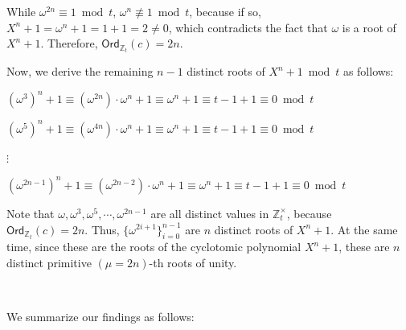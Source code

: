 While $\omega^{2n} \equiv 1 \bmod t$, $\omega^{n} \not\equiv 1 \bmod t$, because if so, $X^n + 1 = \omega^n + 1 = 1 + 1 = 2 \neq 0$, which contradicts the fact that $\omega$ is a root of $X^n + 1$. Therefore, $\textsf{Ord}_{\mathbb{Z}_t}(c) = 2n$. 

Now, we derive the remaining $n-1$ distinct roots of $X^n + 1 \bmod t$ as follows:

$(\omega^3)^n + 1 \equiv (\omega^{2n})\cdot \omega^n + 1 \equiv \omega^n + 1 \equiv t - 1 + 1 \equiv 0 \bmod t$

$(\omega^5)^n + 1 \equiv (\omega^{4n})\cdot \omega^n + 1 \equiv \omega^n + 1 \equiv t - 1 + 1 \equiv 0 \bmod t$

$\vdots$

$(\omega^{2n - 1})^n + 1 \equiv (\omega^{2n - 2})\cdot \omega^n + 1 \equiv \omega^n + 1 \equiv t - 1 + 1 \equiv 0 \bmod t$

Note that $\omega, \omega^3, \omega^5, \cdots, \omega^{2n - 1}$ are all distinct values in $\mathbb{Z}_t^{\times}$, because $\textsf{Ord}_{\mathbb{Z}_t}(c) = 2n$. Thus, $\{\omega^{2i + 1}\}_{i=0}^{n-1}$ are $n$ distinct roots of $X^n + 1$. At the same time, since these are the roots of the cyclotomic polynomial $X^n + 1$, these are $n$ distinct primitive $(\mu=2n)$-th roots of unity. 


$ $


We summarize our findings as follows:

